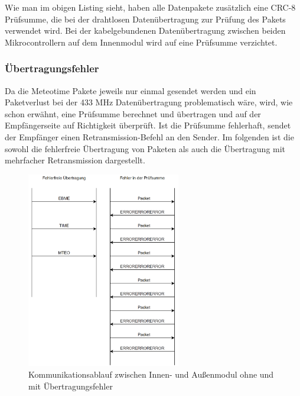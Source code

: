 \documentclass[a4paper,11pt]{article}
\begin{document}
\newpage


\noindent
Wie man im obigen Listing sieht, haben alle Datenpakete zusätzlich eine CRC-8 Prüfsumme, die bei der drahtlosen Datenübertragung 
zur Prüfung des Pakets verwendet wird. Bei der kabelgebundenen Datenübertragung zwischen beiden Mikrocontrollern
auf dem Innenmodul wird auf eine Prüfsumme verzichtet. 

\subsubsection{Übertragungsfehler}
\label{subsubsub:uebertragungsfehler}

Da die Meteotime Pakete jeweils nur einmal gesendet werden und ein Paketverlust bei der 433 MHz Datenübertragung problematisch wäre, wird, wie schon erwähnt, eine Prüfsumme
berechnet und übertragen und auf der Empfängerseite auf Richtigkeit überprüft. Ist die Prüfsumme fehlerhaft, sendet der Empfänger einen Retransmission-Befehl an den Sender.
Im folgenden ist die sowohl die fehlerfreie Übertragung von Paketen als auch die Übertragung mit mehrfacher Retransmission dargestellt. 

\begin{figure}[H]
  \centering
  \includegraphics[width=0.6\textwidth]{Kommunikation}
  \caption{Kommunikationsablauf zwischen Innen- und Außenmodul ohne und mit Übertragungsfehler}
  \label{fig:kommunikation}
\end{figure}
\end{document}
